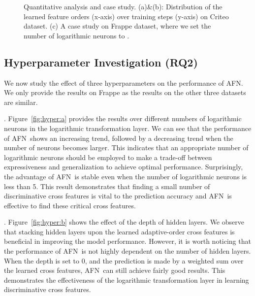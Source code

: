 \documentclass[letterpaper]{article} \usepackage{aaai20}  \usepackage{times}  \usepackage{helvet} \usepackage{courier}  \usepackage[hyphens]{url}  \usepackage{graphicx} \urlstyle{rm} \def\UrlFont{\rm}  \usepackage{graphicx}  \frenchspacing  \setlength{\pdfpagewidth}{8.5in}  \setlength{\pdfpageheight}{11in}
\newcommand{\model}{{AFN}~}
\newcommand{\modelns}{{AFN}}
\begin{document}
\begin{figure*}
\centering
{}

\parbox[b][\ht\tempbox][s]{.6\columnwidth}{

}\qquad  
{}

\caption{Quantitative analysis and case study. (a)\&(b): Distribution of the learned feature orders (x-axis) over training steps (y-axis) on Criteo dataset. (c) A case study on Frappe dataset, where we set the number of logarithmic neurons to .\label{fig:weights}}
\end{figure*}

\subsection{Hyperparameter Investigation (RQ2)}

We now study the effect of three hyperparameters on the performance of \modelns. We only provide the results on Frappe as the results on the other three datasets are similar.

.
Figure~\ref{fig:hyper:a} provides the results over different numbers of logarithmic neurons in the logarithmic transformation layer. We can see that the performance of \model shows an increasing trend, followed by a decreasing trend when the number of neurons becomes larger. This indicates that an appropriate number of logarithmic neurons should be employed to make a trade-off between expressiveness and generalization to achieve optimal performance. Surprisingly, the advantage of \model is stable even when the number of logarithmic neurons is less than 5. This result demonstrates that finding a small number of discriminative cross features is vital to the prediction accuracy and \model is effective to find these critical cross features.


.
Figure~\ref{fig:hyper:b} shows the effect of the depth of hidden layers. We observe that stacking hidden layers upon the learned adaptive-order cross features is beneficial in improving the model performance. However, it is worth noticing that the performance of \model is not highly dependent on the number of hidden layers. When the depth is set to 0, and the prediction is made by a weighted sum over the learned cross features, \model can still achieve fairly good results. This demonstrates the effectiveness of the logarithmic transformation layer in learning discriminative cross features.
\end{document}
